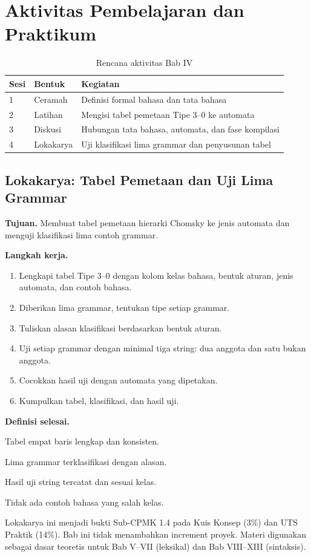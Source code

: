 \section*{Aktivitas Pembelajaran dan Praktikum}

\begin{table}[H]
\centering
\caption{Rencana aktivitas Bab IV}
\label{tab:ch04-aktivitas}
\begin{tabularx}{\textwidth}{@{}llX@{}}
\toprule
\textbf{Sesi} & \textbf{Bentuk} & \textbf{Kegiatan} \\
\midrule
1 & Ceramah & Definisi formal bahasa dan tata bahasa \\
2 & Latihan & Mengisi tabel pemetaan Tipe 3--0 ke automata \\
3 & Diskusi & Hubungan tata bahasa, automata, dan fase kompilasi \\
4 & Lokakarya & Uji klasifikasi lima grammar dan penyusunan tabel \\
\bottomrule
\end{tabularx}
\end{table}

\subsection*{Lokakarya: Tabel Pemetaan dan Uji Lima Grammar}
\textbf{Tujuan.} Membuat tabel pemetaan hierarki Chomsky ke jenis
automata dan menguji klasifikasi lima contoh grammar.

\textbf{Langkah kerja.}
\begin{enumerate}[label=\arabic*.,leftmargin=*]
  \item Lengkapi tabel Tipe 3--0 dengan kolom kelas bahasa, bentuk
        aturan, jenis automata, dan contoh bahasa.
  \item Diberikan lima grammar, tentukan tipe setiap grammar.
  \item Tuliskan alasan klasifikasi berdasarkan bentuk aturan.
  \item Uji setiap grammar dengan minimal tiga string: dua anggota dan
        satu bukan anggota.
  \item Cocokkan hasil uji dengan automata yang dipetakan.
  \item Kumpulkan tabel, klasifikasi, dan hasil uji.
\end{enumerate}

\textbf{Definisi selesai.}
\begin{checklist}
  \item Tabel empat baris lengkap dan konsisten.
  \item Lima grammar terklasifikasi dengan alasan.
  \item Hasil uji string tercatat dan sesuai kelas.
  \item Tidak ada contoh bahasa yang salah kelas.
\end{checklist}

Lokakarya ini menjadi bukti Sub-CPMK 1.4 pada Kuis Konsep (3\%) dan
UTS Praktik (14\%). Bab ini tidak menambahkan increment proyek.
Materi digunakan sebagai dasar teoretis untuk Bab V--VII (leksikal)
dan Bab VIII--XIII (sintaksis).
